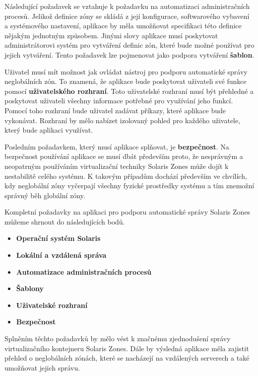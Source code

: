 Následující požadavek se vztahuje k požadavku na automatizaci administračních procesů. Jelikož definice zóny se skládá z její
konfigurace, softwarového vybavení a systémového nastavení, aplikace by měla umožňovat specifikaci této definice nějakým 
jednotným způsobem. Jinými slovy aplikace musí poskytovat administrátorovi systém pro vytváření definic zón, které bude možné
používat pro jejich vytváření. Tento požadavek lze pojmenovat jako podpora vytváření \textbf{šablon}.

Uživatel musí mít možnost jak ovládat nástroj pro podporu automatické správy neglobálních zón. To znamená, že aplikace bude
poskytovat uživateli své funkce pomocí \textbf{uživatelského rozhraní}. Toto uživatelské rozhraní musí být přehledné a poskytovat
uživateli všechny informace potřebné pro využívání jeho funkcí. Pomocí toho rozhraní bude uživatel zadávat příkazy, které
aplikace bude vykonávat. Rozhraní by mělo nabízet izolovaný pohled pro každého uživatele, který bude aplikaci využívat.

Posledním požadavkem, který musí aplikace splňovat, je \textbf{bezpečnost}. Na bezpečnost používání aplikace se musí dbát především
proto, že nesprávným a neopatrným používáním virtualizační techniky Solaris Zones může dojít k nestabilitě celého systému.
K takovým případům dochází především ve chvílích, kdy neglobální zóny vyčerpají všechny fyzické prostředky systému a tím
znemožní správný běh globální zóny.

Kompletní požadavky na aplikaci pro podporu automatické správy Solaris Zones můžeme shrnout do následujících bodů.
\begin{itemize}
 \item \textbf{Operační systém Solaris}
 \item \textbf{Lokální a vzdálená správa}
 \item \textbf{Automatizace administračních procesů}
 \item \textbf{Šablony}
 \item \textbf{Uživatelské rozhraní}
 \item \textbf{Bezpečnost}
\end{itemize}
Splněním těchto požadavků by mělo vést k značnému zjednodušení správy virtualizačního kontejneru Solaris Zones. Dále by výsledná
aplikace měla zajistit přehled o neglobálních zónách, které se nacházejí na vzdálených serverech a také umožňovat jejich správu. 
